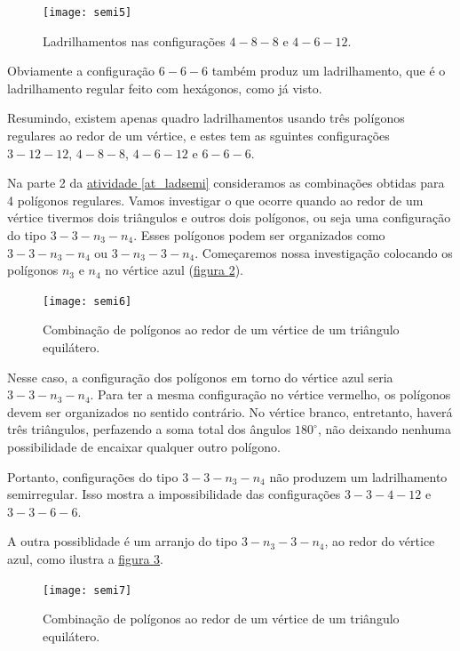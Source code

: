 \begin{figure}[H]
\centering
\texttt{[image: semi5]}
\caption{Ladrilhamentos nas configurações $4-8-8$ e $4-6-12$.}
\label{semi5}
\end{figure}

Obviamente a configuração $6-6-6$ também produz um ladrilhamento, que é o ladrilhamento regular feito com hexágonos, como já visto.

Resumindo, existem apenas quadro ladrilhamentos usando três polígonos regulares
ao redor de um vértice, e estes tem as sguintes configurações  $3-12-12$, $4-8-8$,  $4-6-12$  e $6-6-6$.

Na parte 2 da \hyperref[at_ladsemi]{atividade \ref{at_ladsemi}} consideramos as combinações obtidas para 4 polígonos regulares. 
Vamos investigar o que ocorre quando ao redor de um vértice tivermos  dois triângulos e outros dois polígonos, ou seja uma configuração do tipo $3-3-n_3-n_4$. Esses polígonos podem ser organizados como $3-3-n_3-n_4$ ou $3-n_3-3-n_4$. 
Começaremos nossa investigação colocando os polígonos $n_3$ e $n_4$ no vértice azul (\hyperref[semi6]{figura \ref{semi6}}). 


\begin{figure}[H]
\centering
\texttt{[image: semi6]}
\caption{Combinação de polígonos ao redor de um vértice de um triângulo equilátero.}
\label{semi6}
\end{figure}


Nesse caso, a configuração dos polígonos em torno do vértice azul seria $3-3-n_3-n_4$. Para ter a mesma configuração no vértice vermelho, os polígonos devem ser organizados no sentido contrário. No vértice branco, entretanto, haverá três triângulos, perfazendo a soma total dos ângulos $180^{\circ}$, não deixando nenhuma possibilidade de encaixar qualquer outro polígono. 

Portanto, configurações do tipo $3-3-n_3-n_4$ não produzem um ladrilhamento semirregular. Isso mostra a impossibilidade das configurações $3-3-4-12$ e $3-3-6-6$.

A outra possiblidade é um  arranjo do tipo $3-n_3-3-n_4$, ao redor do vértice azul, como ilustra a \hyperref[semi7]{figura \ref{semi7}}.



\begin{figure}[H]
\centering
\texttt{[image: semi7]}
\caption{Combinação de polígonos ao redor de um vértice de um triângulo equilátero.}
\label{semi7}
\end{figure}

